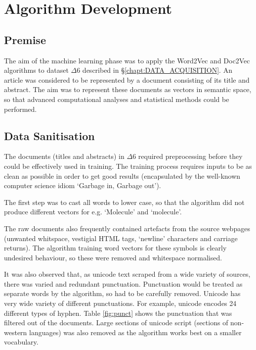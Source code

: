 \chapter{Algorithm Development}
\label{chapt:ALGORITHM}
\section{Premise}
The aim of the machine learning phase was to apply the Word2Vec and Doc2Vec algorithms to dataset $\Delta6$ described in \S\ref{chapt:DATA_ACQUISITION}. An article was considered to be represented by a document consisting of its title and abstract. The aim was to represent these documents as vectors in semantic space, so that advanced computational analyses and statistical methods could be performed. 
\section{Data Sanitisation} 
The documents (titles and abstracts) in $\Delta6$ required preprocessing before they could be effectively used in training. The training process requires inputs to be as clean as possible in order to get good results (encapsulated by the well-known computer science idiom `Garbage in, Garbage out'). 

The first step was to cast all words to lower case, so that the algorithm did not produce different vectors for e.g.  `Molecule' and `molecule'.

The raw documents also frequently contained artefacts from the source webpages (unwanted whitspace, vestigial HTML tags, `newline' characters and carriage returns). The algorithm training word vectors for these symbols is clearly undesired behaviour, so these were removed and whitespace normalised.

It was also observed that, as unicode text scraped from a wide variety of sources, there was varied and redundant punctuation. Punctuation would be treated as separate words by the algorithm, so had to be carefully removed. Unicode has very wide variety of different punctuations. For example, unicode encodes 24 different types of hyphen. Table \ref{fig:punct} shows the punctuation that was filtered out of the documents. Large sections of unicode script (sections of non-western languages) was also removed as the algorithm works best on a smaller vocabulary.

